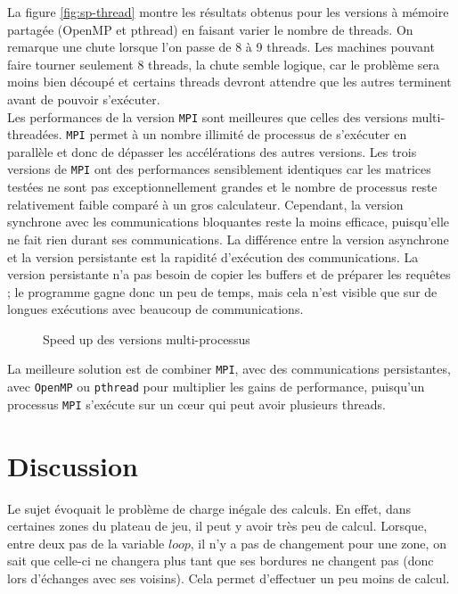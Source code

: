 La figure \ref{fig:sp-thread} montre les résultats obtenus pour les versions à mémoire partagée (OpenMP et pthread) en faisant varier le nombre de threads.
On remarque une chute lorsque l'on passe de 8 à 9 threads. Les machines pouvant faire tourner seulement 8 threads, la chute semble logique, car le problème sera moins bien découpé et certains threads devront attendre que les autres terminent avant de pouvoir s'exécuter.\\



Les performances de la version \texttt{MPI} sont meilleures que celles des versions multi-threadées. \texttt{MPI} permet à un nombre illimité de processus de s'exécuter en parallèle et donc de dépasser les accélérations des autres versions. Les trois versions de \texttt{MPI} ont des performances sensiblement identiques car les matrices testées ne sont pas exceptionnellement grandes et le nombre de processus reste relativement faible comparé à un gros calculateur. Cependant, la version synchrone avec les communications bloquantes reste la moins efficace, puisqu'elle ne fait rien durant ses communications. La différence entre la version asynchrone et la version persistante est la rapidité d'exécution des communications. La version persistante n'a pas besoin de copier les buffers et de préparer les requêtes ; le programme gagne donc un peu de temps, mais cela n'est visible que sur de longues exécutions avec beaucoup de communications.

\begin{figure}[!ht]
\centering
\caption{Speed up des versions multi-processus}
\label{fig:sp-proc}
\end{figure}

La meilleure solution est de combiner \texttt{MPI}, avec des communications persistantes, avec \texttt{OpenMP} ou \texttt{pthread} pour multiplier les gains de performance, puisqu'un processus \texttt{MPI} s'exécute sur un c\oe ur qui peut avoir plusieurs threads.


\section{Discussion} %
\label{sec:discussion}

Le sujet évoquait le problème de charge inégale des calculs. En effet, dans certaines zones du plateau de jeu, il peut y avoir très peu de calcul. Lorsque, entre deux pas de la variable $loop$, il n'y a pas de changement pour une zone, on sait que celle-ci ne changera plus tant que ses bordures ne changent pas (donc lors d'échanges avec ses voisins). Cela permet d'effectuer un peu moins de calcul.

